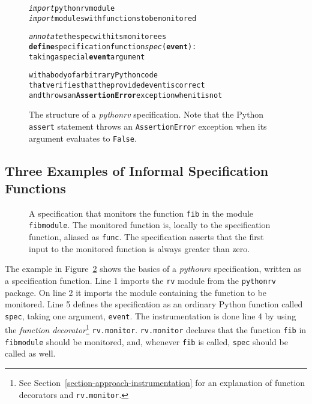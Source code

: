 \documentclass[a4paper,11pt]{kth-mag}
\begin{document}
\begin{figure}[h!]
	\begin{center}
	\begin{minipage}{0.7\textwidth}
    \begin{alltt}
\emph{import} pythonrv module
\emph{import} modules with functions to be monitored

\emph{annotate} the spec with its monitorees
\textbf{define} specification function \textit{spec}(\textbf{event}):
  taking a special \textbf{event} argument

  with a body of arbitrary Python code
  that verifies that the provided event is correct
  and throws an \textbf{AssertionError} exception when it is not
    \end{alltt}
	\end{minipage}
	\end{center}

  \caption{The structure of a \textit{pythonrv} specification. Note that the
    Python \texttt{assert} statement throws an \texttt{AssertionError}
    exception when its argument evaluates to \texttt{False}.}
	\label{figure-pseudo-spec}
\end{figure}

\subsection{Three Examples of Informal Specification Functions}
\lstset{language=Python,numbers=left}

\begin{figure}[h!]
	\begin{center}
	\begin{minipage}{0.7\textwidth}
	
	\end{minipage}
	\end{center}

  \caption{A specification that monitors the function \texttt{fib} in the
    module \texttt{fibmodule}. The monitored function is, locally to the
    specification function, aliased as \texttt{func}. The specification asserts
    that the first input to the monitored function is always greater than
    zero.}
	\label{figure-syntax-example-1}
\end{figure}

The example in Figure~\ref{figure-syntax-example-1} shows the basics of a
\textit{pythonrv} specification, written as a specification function. Line 1
imports the \texttt{rv} module from the \texttt{pythonrv} package. On line 2 it
imports the module containing the function to be monitored. Line 5 defines
the specification as an ordinary Python function called \texttt{spec}, taking
one argument, \texttt{event}. The instrumentation is done line 4 by using the
\textit{function decorator}\footnote{See
Section~\ref{section-approach-instrumentation} for an explanation of function
decorators and \texttt{rv.monitor}.} \texttt{rv.monitor}. \texttt{rv.monitor}
declares that the function \texttt{fib} in \texttt{fibmodule} should be
monitored, and, whenever \texttt{fib} is called, \texttt{spec} should be called
as well.
\end{document}
